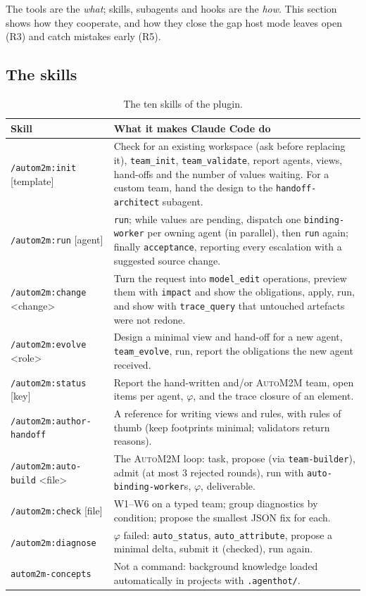 \documentclass[10pt,a4paper]{article}
\newcommand{\auto}{\textsc{AutoM2M}}
\newcommand{\cc}{Claude Code}
\newcommand{\W}[1]{\textsf{W#1}}
\newcommand{\code}[1]{\texttt{#1}}
\newcommand{\file}[1]{\texttt{#1}}
\newcommand{\mcptool}[1]{\texttt{#1}}
\newcommand{\skill}[1]{\texttt{/autom2m:#1}}
\begin{document}
The tools are the \emph{what}; skills, subagents and hooks are the
\emph{how}. This section shows how they cooperate, and how they close the gap
host mode leaves open (R3) and catch mistakes early (R5).

\subsection{The skills}

\begin{table}[!htb]
\centering\small
\caption{The ten skills of the plugin.}
\label{tab:skills}
\begin{tabularx}{\textwidth}{@{}L{4.0cm} Y@{}}
\toprule
{}Skill & What it makes \cc{} do \\
\midrule
\skill{init} [template] & Check for an existing workspace (ask before replacing it), \mcptool{team\_init}, \mcptool{team\_validate}, report agents, views, hand-offs and the number of values waiting. For a custom team, hand the design to the \code{handoff-architect} subagent. \\
\skill{run} [agent] & \mcptool{run}; while values are pending, dispatch one \code{binding-worker} per owning agent (in parallel), then \mcptool{run} again; finally \mcptool{acceptance}, reporting every escalation with a suggested source change. \\
\skill{change} <change> & Turn the request into \mcptool{model\_edit} operations, preview them with \mcptool{impact} and show the obligations, apply, run, and show with \mcptool{trace\_query} that untouched artefacts were not redone. \\
\skill{evolve} <role> & Design a minimal view and hand-off for a new agent, \mcptool{team\_evolve}, run, report the obligations the new agent received. \\
\skill{status} [key] & Report the hand-written and/or \auto{} team, open items per agent, $\varphi$, and the trace closure of an element. \\
\skill{author-handoff} & A reference for writing views and rules, with rules of thumb (keep footprints minimal; validators return reasons). \\
\skill{auto-build} <file> & The \auto{} loop: task, propose (via \code{team-builder}), admit (at most 3 rejected rounds), run with \code{auto-binding-worker}s, $\varphi$, deliverable. \\
\skill{check} [file] & \W{1}--\W{6} on a typed team; group diagnostics by condition; propose the smallest JSON fix for each. \\
\skill{diagnose} & $\varphi$ failed: \mcptool{auto\_status}, \mcptool{auto\_attribute}, propose a minimal delta, submit it (checked), run again. \\
\code{autom2m-concepts} & Not a command: background knowledge loaded automatically in projects with \file{.agenthot/}. \\
\bottomrule
\end{tabularx}
\end{table}
\end{document}
